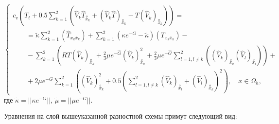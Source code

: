 \documentclass[a4paper]{article}
\theoremstyle{definition}
\numberwithin{equation}{section}
\begin{document}
$$\begin{cases}
c_v \left( T_t + 0.5\sum\limits_{k=1}^2 \left( \hat{V}_k\hat{T}_{\stackrel{o}{x}_k} + (\hat{V}_k\hat{T})_{\stackrel{o}{x}_k} - T(\hat{V}_k)_{\stackrel{o}{x}_k} \right) \right) = \\ \qquad = \tilde{\kappa} \sum\limits_{k=1}^2 \left( \hat{T}_{x_k\bar{x}_k}\right) + \sum\limits_{k=1}^2 (\kappa e^{-G} - \tilde{\kappa}) \left( T_{x_k\bar{x}_k}\right) - \\ \qquad - \sum\limits_{k=1}^2 \left( RT (\hat{V}_k)_{\stackrel{o}{x}_k} + \frac{2}{3}\mu e^{-\hat{G}}(\hat{V}_k)_{\stackrel{o}{x}_k}^2 + \frac{2}{3}\mu e^{-\hat{G}} \sum\limits_{l=1,l\neq k}^2 ((\hat{V}_k)_{\stackrel{o}{x}_k} (\hat{V}_l)_{\stackrel{o}{x}_l}) \right) + \\ \qquad + 2\mu e^{-G} \sum\limits_{k=1}^2 \left( (\hat{V}_k)_{\stackrel{o}{x}_k}^2 + 0.5\left( \sum\limits_{l=1,l\neq k}^2 (\hat{V}_k)_{\stackrel{o}{x}_l} + (\hat{V}_l)_{\stackrel{o}{x}_k} \right)^2 \right), \quad x\in\Omega_h,
\end{cases}$$
где $\tilde{\kappa} = ||\kappa e^{-G}||$, $\tilde{\mu} = ||\mu e^{-G}||$.


Уравнения на слой вышеуказанной разностной схемы примут следующий вид:
\end{document}
